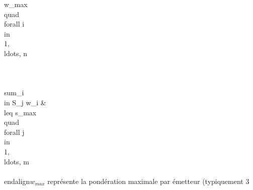 w_{max} \\quad \\forall i \\in \\{1, \\ldots, n\\} \\\\\n\\sum_{i \\in S_j} w_i &\\leq s_{max} \\quad \\forall j \\in \\{1, \\ldots, m\\}\n\\end{align}\n{} $w_{max}$ représente la pondération maximale par émetteur (typiquement 3%